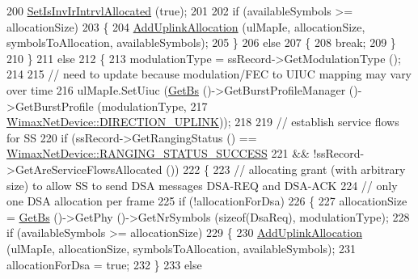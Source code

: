 \begin{DoxyCode}
200           \hyperlink{classns3_1_1UplinkScheduler_a766e3b6c032052002929eb351934e42b}{SetIsInvIrIntrvlAllocated} (\textcolor{keyword}{true});
201 
202           \textcolor{keywordflow}{if} (availableSymbols >= allocationSize)
203             \{
204               \hyperlink{classns3_1_1UplinkSchedulerRtps_aea8d8f5701bf3b5f992d1b43471340d2}{AddUplinkAllocation} (ulMapIe, allocationSize, symbolsToAllocation, 
      availableSymbols);
205             \}
206           \textcolor{keywordflow}{else}
207             \{
208               \textcolor{keywordflow}{break};
209             \}
210         \}
211       \textcolor{keywordflow}{else}
212         \{
213           modulationType = ssRecord->GetModulationType ();
214 
215           \textcolor{comment}{// need to update because modulation/FEC to UIUC mapping may vary over time}
216           ulMapIe.SetUiuc (\hyperlink{classns3_1_1UplinkScheduler_afe61b7de71d92d2dff1b135744a6ff7e}{GetBs} ()->GetBurstProfileManager ()->GetBurstProfile (modulationType,
217                                                                                  
      \hyperlink{classns3_1_1WimaxNetDevice_a194b6cf7eb59582328eb2531dc9ed884ad37a477621d1df190ff8d8fb933349cd}{WimaxNetDevice::DIRECTION\_UPLINK}));
218 
219           \textcolor{comment}{// establish service flows for SS}
220           \textcolor{keywordflow}{if} (ssRecord->GetRangingStatus () == 
      \hyperlink{classns3_1_1WimaxNetDevice_a2a74c0f01e51abc1851a630242e7b591a2a48f503c20971a1a5901af0b6d0746c}{WimaxNetDevice::RANGING\_STATUS\_SUCCESS}
221               && !ssRecord->GetAreServiceFlowsAllocated ())
222             \{
223               \textcolor{comment}{// allocating grant (with arbitrary size) to allow SS to send DSA messages DSA-REQ and
       DSA-ACK}
224               \textcolor{comment}{// only one DSA allocation per frame}
225               \textcolor{keywordflow}{if} (!allocationForDsa)
226                 \{
227                   allocationSize = \hyperlink{classns3_1_1UplinkScheduler_afe61b7de71d92d2dff1b135744a6ff7e}{GetBs} ()->GetPhy ()->GetNrSymbols (\textcolor{keyword}{sizeof}(DsaReq), modulationType);
228                   \textcolor{keywordflow}{if} (availableSymbols >= allocationSize)
229                     \{
230                       \hyperlink{classns3_1_1UplinkSchedulerRtps_aea8d8f5701bf3b5f992d1b43471340d2}{AddUplinkAllocation} (ulMapIe, allocationSize, symbolsToAllocation,
       availableSymbols);
231                       allocationForDsa = \textcolor{keyword}{true};
232                     \}
233                   \textcolor{keywordflow}{else}

\end{DoxyCode}
